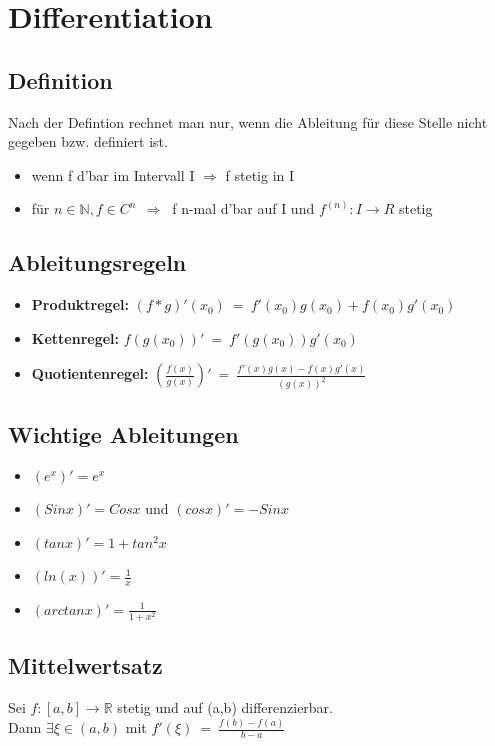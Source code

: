 \documentclass[a4paper,12pt]{article} %
\begin{document}
\section{Differentiation}
\subsection{Definition}
Nach der Defintion rechnet man nur, wenn die Ableitung für diese Stelle nicht gegeben bzw. definiert ist.
\begin{center}
\end{center}
\begin{itemize}
\item wenn f d'bar im Intervall I $\Rightarrow$ f stetig in I
\item für $n \in \mathbb{N}, f \in C^n \ \ \Rightarrow \ $ f n-mal d'bar auf I und $f^{(n)} : I \rightarrow R$ stetig
\end{itemize}

\subsection{Ableitungsregeln}
\begin{itemize}
\item \textbf{Produktregel:} $(f*g)'(x_0) \ = \ f'(x_0)g(x_0) + f(x_0)g'(x_0)$
\item \textbf{Kettenregel:} $f(g(x_0))' \ = \ f'(g(x_0)) g'(x_0)$
\item \textbf{Quotientenregel:} $(\frac{f(x)}{g(x)})' \ = \ \frac{f'(x)g(x) - f(x)g'(x)}{(g(x))^2}$
\end{itemize}

\subsection{Wichtige Ableitungen}
\begin{itemize}
\item $(e^x)' = e^x$
\item $(Sin x)' = Cos x$ und $(cos x )' = -Sin x$
\item $(tan x)' = 1+tan^2 x$
\item $(ln(x))' = \frac{1}{x}$
\item $(arctan x)' = \frac{1}{1+x^2}$
\end{itemize}

\subsection{Mittelwertsatz}
Sei $f:[a,b]\rightarrow \mathbb{R}$ stetig und auf (a,b) differenzierbar.\\
Dann $\exists \xi \in (a,b)$ mit $f'(\xi)\ = \ \frac{f(b)-f(a)}{b-a}$
\end{document}
